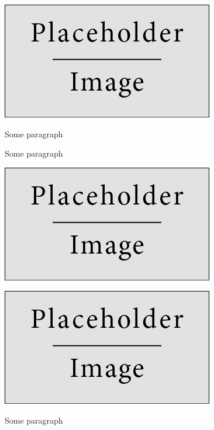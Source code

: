 \documentclass[12pt, a4 paper]{article}
\begin{document}
\begin{center}
\begin{Large}
\begin{multicols}{2}
\end{multicols}

\begin{multicols}{2}
\includegraphics[width=\linewidth]{placeholder.jpg}

\columnbreak
Some paragraph
  
\end{multicols} 

\begin{multicols}{2}
Some paragraph

\columnbreak
\includegraphics[width=\linewidth]{placeholder.jpg}
  
\end{multicols} 

\begin{multicols}{2}
\includegraphics[width=\linewidth]{placeholder.jpg}

\columnbreak
Some paragraph
  
\end{multicols} 

\end{Large} 
\end{center}
\end{document}
